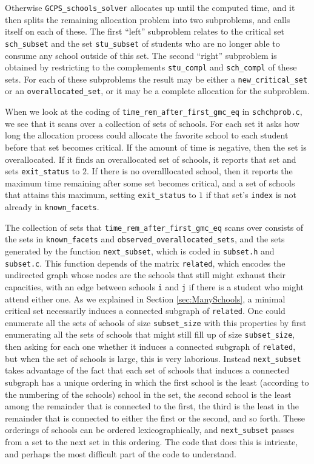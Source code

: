\documentclass[12pt]{article}
\theoremstyle{definition}
\begin{document}
\begin{appendix}
Otherwise \texttt{GCPS\_schools\_solver} allocates up until the
computed time, and it then splits the remaining allocation problem
into two subproblems, and calls itself on each of these. The first
``left'' subproblem relates to the critical set \texttt{sch\_subset}
and the set \texttt{stu\_subset} of students who are no longer able to
consume any school outside of this set.  The second ``right''
subproblem is obtained by restricting to the complements
\texttt{stu\_compl} and \texttt{sch\_compl} of these sets.  For each
of these subproblems the result may be either a
\texttt{new\_critical\_set} or an \texttt{overallocated\_set}, or it
may be a complete allocation for the subproblem.

When we look at the coding of
\texttt{time\_rem\_after\_first\_gmc\_eq} in
\texttt{schchprob.c}, we see that it scans over a collection of sets
of schools. For each set it asks how long the allocation process could
allocate the favorite school to each student before that set becomes
critical.  If the amount of time is negative, then the set is
overallocated.  If it finds an overallocated set of schools, it
reports that set and sets \texttt{exit\_status} to $2$.  If there is
no overalllocated school, then it reports the maximum time remaining
after some set becomes critical, and a set of schools that attains
this maximum, setting \texttt{exit\_status} to $1$ if that set's
\texttt{index} is not already in \texttt{known\_facets}.

The collection of sets that \texttt{time\_rem\_after\_first\_gmc\_eq}
scans over consists of the sets in \texttt{known\_facets} and
\texttt{observed\_overallocated\_sets}, and the sets generated by the
function \texttt{next\_subset}, which is coded in \texttt{subset.h}
and \texttt{subset.c}.  This function depends of the matrix
\texttt{related}, which encodes the undirected graph whose nodes are
the schools that still might exhaust their capacities, with an edge
between schools \texttt{i} and \texttt{j} if there is a student who
might attend either one.  As we explained in Section
\ref{sec:ManySchools}, a minimal critical set necessarily induces a
connected subgraph of \texttt{related}.  One could enumerate all the
sets of schools of size \texttt{subset\_size} with this properties by
first enumerating all the sets of schools that might still fill up of
size \texttt{subset\_size}, then asking for each one whether it
induces a connected subgraph of \texttt{related}, but when the set of
schools is large, this is very laborious.  Instead
\texttt{next\_subset} takes advantage of the fact that each set of
schools that induces a connected subgraph has a unique ordering in
which the first school is the least (according to the numbering of the
schools) school in the set, the second school is the least among the
remainder that is connected to the first, the third is the least in
the remainder that is connected to either the first or the second, and
so forth.  These orderings of schools can be ordered
lexicographically, and \texttt{next\_subset} passes from a set to the
next set in this ordering.  The code that does this is intricate, and
perhaps the most difficult part of the code to understand.


\end{appendix}
\end{document}
